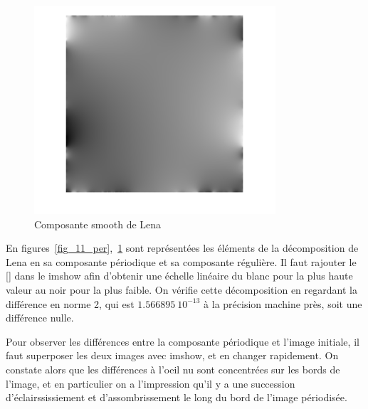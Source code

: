 \documentclass[12pt,a4paper,onecolumn]{article}
\begin{document}
\begin{figure}[H]
	\centering
	\includegraphics[width = 0.8\textwidth]{smooth}
	\caption{Composante smooth de Lena}
	\label{fig_11_smooth}
\end{figure}

En figures~\ref{fig_11_per},~\ref{fig_11_smooth} sont représentées les éléments de la décomposition de Lena en sa composante périodique et sa composante régulière. Il faut rajouter le [] dans le imshow afin d'obtenir une échelle linéaire du blanc pour la plus haute valeur au noir pour la plus faible. On vérifie cette décomposition en regardant la différence en norme 2, qui est \(1.566895~10^{-13}\) à la précision machine près, soit une différence nulle.

Pour observer les différences entre la composante périodique et l'image initiale, il faut superposer les deux images avec imshow, et en changer rapidement. On constate alors que les différences à l'oeil nu sont concentrées sur les bords de l'image, et en particulier on a l'impression qu'il y a une succession d'éclairssissiement et d'assombrissement le long du bord de l'image périodisée.
\end{document}
